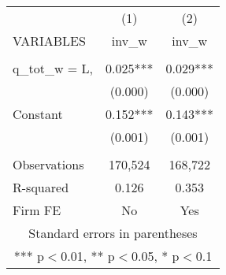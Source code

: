 \documentclass[]{article}
\begin{document}
\begin{tabular}{lcc} \hline
 & (1) & (2) \\
VARIABLES & inv\_w & inv\_w \\ \hline
 &  &  \\
q\_tot\_w = L, & 0.025*** & 0.029*** \\
 & (0.000) & (0.000) \\
Constant & 0.152*** & 0.143*** \\
 & (0.001) & (0.001) \\
 &  &  \\
Observations & 170,524 & 168,722 \\
R-squared & 0.126 & 0.353 \\
 Firm FE & No & Yes \\ \hline
\multicolumn{3}{c}{ Standard errors in parentheses} \\
\multicolumn{3}{c}{ *** p$<$0.01, ** p$<$0.05, * p$<$0.1} \\
\end{tabular}
\end{document}

